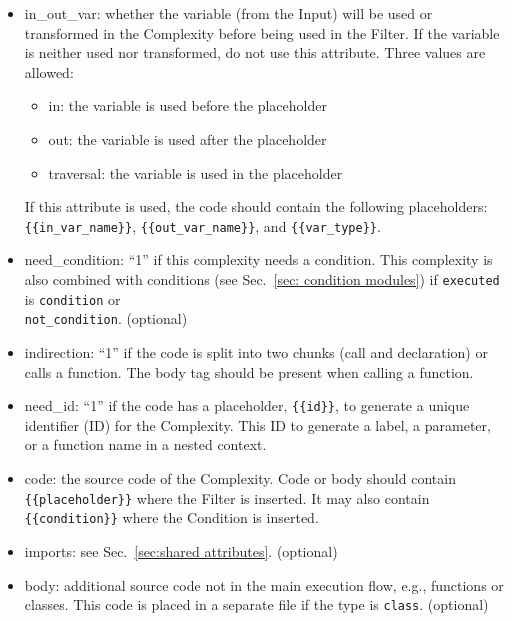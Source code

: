 \begin{itemize}
    \item in\_out\_var: whether the variable (from the Input) will be used or
    transformed in the Complexity before being used in the Filter.  If the
    variable is neither used nor transformed, do not use this attribute.
    Three values are allowed:
    \begin{itemize}[nosep]
        \item in: the variable is used before the placeholder
        \item out: the variable is used after the placeholder
        \item traversal: the variable is used in the placeholder
    \end{itemize}
    If this attribute is used, the code should contain the following
    placeholders: \\
    \verb|{{in_var_name}}|, \verb|{{out_var_name}}|, and \verb|{{var_type}}|.

    \item need\_condition: ``1'' if this complexity needs a condition.
      This complexity is also combined with conditions (see
      Sec.~\ref{sec: condition modules}) if \verb|executed| is \verb|condition|
      or \\ \verb|not_condition|. (optional)

    \item indirection: ``1'' if the code is split into two chunks (call and
    declaration) or calls a function.  The body tag should be present when
    calling a function.

    \item need\_id: ``1'' if the code has a placeholder, \verb|{{id}}|,
    to generate a unique identifier (ID) for the Complexity.  This ID to generate
    a label, a parameter, or a function name in a nested
    context.

    \item code: the source code of the Complexity.  Code or
    body should contain \\ \verb|{{placeholder}}|
    where the Filter is inserted.  It may also contain
    \verb|{{condition}}| where the Condition
    is inserted.

    \item imports: see Sec.~\ref{sec:shared attributes}. (optional)

    \item body: additional source code not in the main execution flow,
    e.g., functions or classes.  This code is placed in a separate file
    if the type is \verb|class|. (optional)
\end{itemize}

